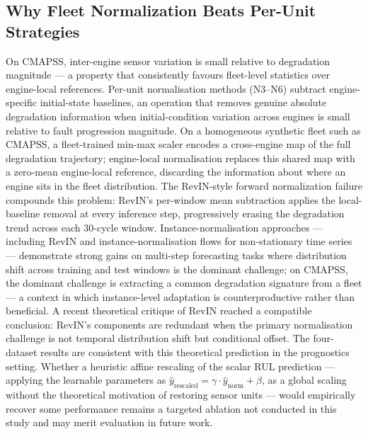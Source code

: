 \documentclass[preprint,10pt]{elsarticle}
\begin{document}
\subsection{Why Fleet Normalization Beats Per-Unit Strategies}

On CMAPSS, inter-engine sensor variation is small relative to degradation magnitude --- a property that consistently favours fleet-level statistics over engine-local references. Per-unit normalisation methods (N3–N6) subtract engine-specific initial-state baselines, an operation that removes genuine absolute degradation information when initial-condition variation across engines is small relative to fault progression magnitude. On a homogeneous synthetic fleet such as CMAPSS, a fleet-trained min-max scaler encodes a cross-engine map of the full degradation trajectory; engine-local normalisation replaces this shared map with a zero-mean engine-local reference, discarding the information about where an engine sits in the fleet distribution. The RevIN-style forward normalization \cite{ref23} failure compounds this problem: RevIN's per-window mean subtraction applies the local-baseline removal at every inference step, progressively erasing the degradation trend across each 30-cycle window. Instance-normalisation approaches --- including RevIN \cite{ref23} and instance-normalisation flows for non-stationary time series \cite{ref28} --- demonstrate strong gains on multi-step forecasting tasks where distribution shift across training and test windows is the dominant challenge; on CMAPSS, the dominant challenge is extracting a common degradation signature from a fleet — a context in which instance-level adaptation is counterproductive rather than beneficial. A recent theoretical critique of RevIN \cite{ref25,ref26} reached a compatible conclusion: RevIN's components are redundant when the primary normalisation challenge is not temporal distribution shift but conditional offset. The four-dataset results are consistent with this theoretical prediction in the prognostics setting. Whether a heuristic affine rescaling of the scalar RUL prediction --- applying the learnable parameters as $\hat{y}_{\text{rescaled}} = \gamma \cdot \hat{y}_{\text{norm}} + \beta$, as a global scaling without the theoretical motivation of restoring sensor units --- would empirically recover some performance remains a targeted ablation not conducted in this study and may merit evaluation in future work.
\end{document}
